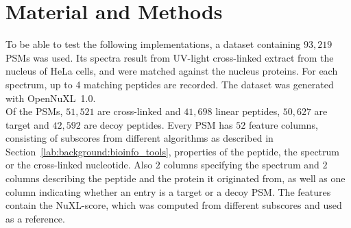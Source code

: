 
\chapter{Material and Methods}
\label{matmet}
\label{lab:matmet:dataset}
To be able to test the following implementations, a dataset containing $93,219$ PSMs was used. Its spectra result from UV-light cross-linked extract from the nucleus of HeLa cells, and were matched against the nucleus proteins. For each spectrum, up to 4 matching peptides are recorded. The dataset was generated with OpenNuXL~1.0.\\
Of the PSMs, $51,521$ are cross-linked and $41,698$ linear peptides, $50,627$ are target and $42,592$ are decoy peptides. Every PSM has $52$ feature columns, consisting of subscores from different algorithms as described in Section~\ref{lab:background:bioinfo_tools}, properties of the peptide, the spectrum or the cross-linked nucleotide. Also $2$ columns specifying the spectrum and $2$ columns describing the peptide and the protein it originated from, as well as one column indicating whether an entry is a target or a decoy PSM. The features contain the NuXL-score, which was computed from different subscores and used as a reference.
\renewcommand{\baselinestretch}{0.9}
